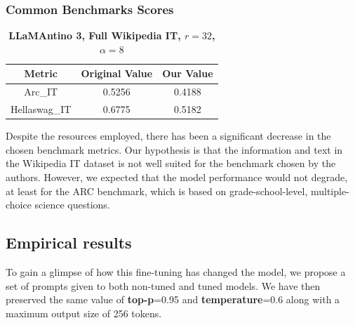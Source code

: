 \documentclass{article}
\begin{document}
	\subsubsection{Common Benchmarks Scores}
	\begin{table}[h]
		\center
		\begin{tabular}{ccc}
			\toprule
			\textbf{Metric} & \textbf{Original Value} & \textbf{Our Value} \\
			\midrule
			Arc\_IT & 0.5256 & 0.4188 \\
			Hellaswag\_IT &	0.6775 & 0.5182 \\
			\bottomrule
		\end{tabular}
		\caption{\textbf{LLaMAntino 3, Full Wikipedia IT, $r=32$, $\alpha=8$}}
	\end{table} 
	
	Despite the resources employed, there has been a significant decrease in the chosen benchmark metrics. Our hypothesis is that the information and text in the Wikipedia IT dataset is not well suited for the benchmark chosen by the authors. However, we expected that the model performance would not degrade, at least for the ARC benchmark, which is based on grade-school-level, multiple-choice science questions.
	
	\subsection{Empirical results}
	To gain a glimpse of how this fine-tuning has changed the model, we propose a set of prompts given to both non-tuned and tuned models. We have then preserved the same value of \textbf{top-p}=0.95 and \textbf{temperature}=0.6 along with a maximum output size of 256 tokens. \\
	
\end{document}
